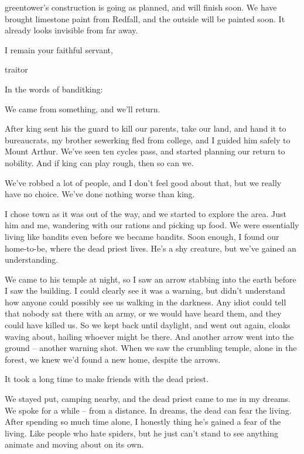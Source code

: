 \begin{multicols}{2}
\begin{exampletext}
  \Gls{greentower}'s construction is going as planned, and will finish soon.
  We have brought limestone paint from Redfall, and the outside will be painted soon.
  It already looks invisible from far away.

  I remain your faithful servant,

  \gls{traitor}

\end{exampletext}

In the words of \gls{banditking}:

\begin{exampletext}

  We came from something, and we'll return.

  After \gls{king} sent his the \gls{guard} to kill our parents, take our land, and hand it to bureaucrats, my brother \gls{sewerking} fled from \gls{college}, and I guided him safely to Mount Arthur.
  \iftoggle{aif}{
    \footnote{See \textit{Fenestra}, \autopageref{whiteplainsWar} for the massacre of Whiteplains.}
  }{}%
  We've seen ten cycles pass, and started planning our return to nobility.
  And if \gls{king} can play rough, then so can we.

  We've robbed a lot of people, and I don't feel good about that, but we really have no choice.
  We've done nothing worse than \gls{king}.

  I chose \gls{town} as it was out of the way, and we started to explore the area.
  Just him and me, wandering with our rations and picking up food.
  We were essentially living like bandits even before we became bandits.
  Soon enough, I found our home-to-be, where the dead priest lives.
  He's a shy creature, but we've gained an understanding.

  We came to his temple at night, so I saw an arrow stabbing into the earth before I saw the building.
  I could clearly see it was a warning, but didn't understand how anyone could possibly see us walking in the darkness.
  Any idiot could tell that nobody sat there with an army, or we would have heard them, and they could have killed us.
  So we kept back until daylight, and went out again, cloaks waving about, hailing whoever might be there.
  And another arrow went into the ground -- another warning shot.
  When we saw the crumbling temple, alone in the forest, we knew we'd found a new home, despite the arrows.

  It took a long time to make friends with the dead priest.

  We stayed put, camping nearby, and the dead priest came to me in my dreams.
  We spoke for a while -- from a distance.
  In dreams, the dead can fear the living.
  After spending so much time alone, I honestly thing he's gained a fear of the living.
  Like people who hate spiders, but he just can't stand to see anything animate and moving about on its own.


\end{exampletext}
\end{multicols}
